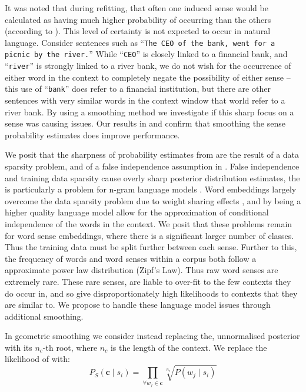 \documentclass{sig-alternate}
\renewcommand{\c}{\mathbf{c}}
\newcommand{\wordquote}[1]{\enquote{\texttt{#1}}}
\begin{document}
It was noted that during refitting, that often one induced sense would be calculated as having much higher probability of occurring than the others (according to ). This level of certainty is not expected to occur in natural language. Consider sentences such as \wordquote{The CEO of the bank, went for a picnic by the river.} While \wordquote{CEO} is closely linked to a financial bank, and \wordquote{river} is strongly linked to a river bank, we do not wish for the occurrence of either word in the context to completely negate the possibility of either sense -- this use of \wordquote{bank} does refer to a financial institution, but there are other sentences with very similar words in the context window that world refer to a river bank.
By using a smoothing method we investigate if this sharp focus on a sense was causing issues.
Our results in  and  confirm that smoothing the sense probability estimates does improve performance.


We posit that the sharpness of probability estimates from  are the result of a data sparsity problem, and of a false independence assumption in . False independence and training data sparsity cause overly sharp posterior distribution estimates, the is particularly a problem for n-gram language models \cite{rosenfeld2000two}.
Word  embeddings largely overcome the data sparsity problem due to weight sharing effects \parencite{NPLM},  and by being a higher quality language model allow for the approximation of conditional independence of the words in the context.
We posit that these problems remain for word sense embeddings, where there is a significant larger number of classes.
Thus the training data must be split further between each sense. 
Further to this, the frequency of words \parencite{zipf1949human}  and word senses \parencite{Kilgarriff2004} within a corpus both follow a approximate power law distribution (Zipf's Law).
Thus raw word senses are extremely rare.
These rare senses, are liable to over-fit to the few contexts they do occur in, and so give disproportionately high likelihoods to contexts that they are similar to.
We propose to handle these language model issues through additional smoothing.


In geometric smoothing we consider instead replacing the, unnormalised posterior  with its $n_c$-th root, where $n_c$ is the length of the context.
We replace the likelihood of  with:
\begin{equation} \label{eq:contrextprobsmooth}
P_S(\c \mid s_{i})=\prod_{\forall w_{j}\in\c}\sqrt[n_c]{P(w_{j} \mid s_{i})}
\end{equation}
\end{document}
